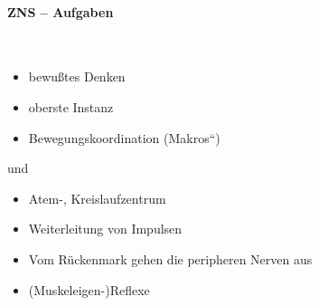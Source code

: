 {}

\paragraph{ZNS -- Aufgaben}~



\begin{itemize}
    \item bewu{\ss}tes Denken
    \item oberste Instanz
\end{itemize}



\begin{itemize}
    \item Bewegungskoordination ({\quotedblbase}Makros{\textquotedblleft})
\end{itemize}

 und 

\begin{itemize}
    \item Atem-, Kreislaufzentrum
\end{itemize}


\begin{itemize}
    \item Weiterleitung von Impulsen
    \item Vom R\"uckenmark gehen die peripheren Nerven aus
    \item (Muskeleigen-)Reflexe
\end{itemize}


